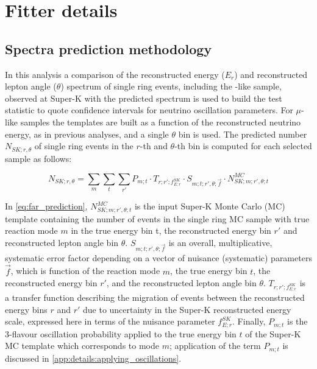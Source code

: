 \section{Fitter details}
\label{app:details}

\subsection {Spectra prediction methodology}
\label{app:details:spectra_methodology}

In this analysis a comparison of the reconstructed energy ($E_{r}$) and reconstructed lepton angle ($\theta$) spectrum of single ring events, including the \nueCConepi{}-like sample, observed at Super-K with the predicted spectrum is used to build the test statistic to quote confidence intervals for neutrino oscillation parameters. For $\mu$-like samples the templates are built as a function of the reconstructed neutrino energy, as in previous analyses, and a single $\theta$ bin is used. The predicted number $N_{SK;r,\theta}$ of single ring events in the $r$-th and $\theta$-th bin is computed for each selected sample as follows:

\begin{equation}
\displaystyle
  N_{SK;r,\theta} = 
    \sum_{m} \sum_{t} \sum_{r\prime}
        P_{m;t} \cdot
        T_{r;r\prime;f_{E; r}^{SK}} \cdot
        S_{m;t;r\prime,\theta;\vec{f}} \cdot
        N_{SK;m;r\prime,\theta;t}^{MC} 
         \label{eq:far_prediction}
\end{equation}

In \ref{eq:far_prediction}, $N_{SK;m;r\prime,\theta;t}^{MC}$ is the input Super-K Monte Carlo (MC) template containing the number of events in the single ring MC sample with true reaction mode $m$ in the true energy bin t, the reconstructed energy bin $r\prime$ and reconstructed lepton angle bin $\theta$. $S_{m;t;r\prime,\theta;\vec{f}}$ is an overall, multiplicative, systematic error factor depending on a vector of nuisance (systematic) parameters $\vec{f}$, which is function of the reaction mode $m$, the true energy bin $t$, the reconstructed energy bin $r\prime$, and the reconstructed lepton angle bin $\theta$. $T_{r;r\prime;f_{E; r}^{SK}}$ is a transfer function describing the migration of events between the reconstructed energy bins $r$ and $r\prime$ due to uncertainty in the Super-K reconstructed energy scale, expressed here in terms of the nuisance parameter $f_{E; r}^{SK}$. Finally, $P_{m;t}$ is the 3-flavour oscillation probability applied to the true energy
bin \(t\) of the Super-K MC template which corresponds to mode $m$; application of the term $P_{m;t}$ is discussed in \ref{app:details:applying_oscillations}.
